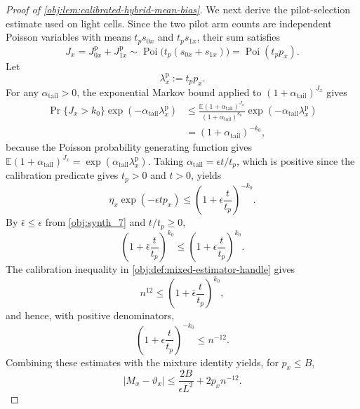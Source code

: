 \begin{proof}[Proof of \cref{obj:lem:calibrated-hybrid-mean-bias}]
We next derive the pilot-selection estimate used on light cells. Since the two pilot arm counts are independent Poisson variables with means
\(t_p s_{0x}\) and \(t_p s_{1x}\), their sum satisfies
\[
J_x=J_{0x}^{\mathrm p}+J_{1x}^{\mathrm p}
\sim
\operatorname{Poi}\bigl(t_p(s_{0x}+s_{1x})\bigr)
=
\operatorname{Poi}(t_pp_x).
\]
Let
\[
\lambda_x^{\mathrm p}:=t_p p_x.
\]
For any
\(\alpha_{\mathrm{tail}}>0\), the exponential Markov bound applied to
\((1+\alpha_{\mathrm{tail}})^{J_x}\) gives
\[
\begin{aligned}
\Pr\{J_x>k_0\}\exp(-\alpha_{\mathrm{tail}}\lambda_x^{\mathrm p})
&\le
\frac{\mathbb E(1+\alpha_{\mathrm{tail}})^{J_x}}
     {(1+\alpha_{\mathrm{tail}})^{k_0}}
\exp(-\alpha_{\mathrm{tail}}\lambda_x^{\mathrm p}) \\
&=
\left(1+\alpha_{\mathrm{tail}}\right)^{-k_0},
\end{aligned}
\]
because the Poisson probability generating function gives
\(\mathbb E(1+\alpha_{\mathrm{tail}})^{J_x}
=\exp(\alpha_{\mathrm{tail}}\lambda_x^{\mathrm p})\).  Taking
\(\alpha_{\mathrm{tail}}=\epsilon t/t_p\), which is positive since the
calibration predicate gives \(t_p>0\) and \(t>0\), yields
\[
\eta_x\exp(-\epsilon t p_x)
\le
\left(1+\epsilon\frac{t}{t_p}\right)^{-k_0}.
\]
By \(\bar\epsilon\le\epsilon\) from \cref{obj:synth_7} and \(t/t_p\ge0\),
\[
\left(1+\bar\epsilon\frac{t}{t_p}\right)^{k_0}
\le
\left(1+\epsilon\frac{t}{t_p}\right)^{k_0}.
\]
The calibration inequality in \cref{obj:def:mixed-estimator-handle} gives
\[
n^{12}\le\left(1+\bar\epsilon\frac{t}{t_p}\right)^{k_0},
\]
and hence, with positive denominators,
\[
\left(1+\epsilon\frac{t}{t_p}\right)^{-k_0}
\le
n^{-12}.
\]
Combining these estimates with the mixture identity yields, for \(p_x\le B\),
\[
|M_x-\vartheta_x|
\le
\frac{2B}{\epsilon L^2}+2p_x n^{-12}.
\]


\end{proof}
